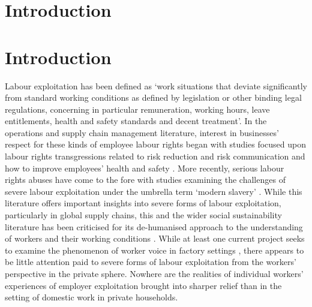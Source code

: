\documentclass[
  12pt,
  letterpaper,
  DIV=11,
  numbers=noendperiod]{scrartcl}
\theoremstyle{plain}
\theoremstyle{definition}
\renewcommand*\contentsname{Table of contents}
\newcommand\contentsname{Table of contents}
\begin{document}
\renewcommand*\contentsname{Table of contents}
{
\hypersetup{linkcolor=}
\setcounter{tocdepth}{3}
\tableofcontents
}

\newpage

\section{Introduction}\label{introduction}

\section{Introduction}\label{introduction}

Labour exploitation has been defined as `work situations that deviate 
significantly from standard working conditions as defined by legislation
or other binding legal regulations, concerning in particular
remuneration, working hours, leave entitlements, health and safety
standards and decent treatment'\autocite[10]{european_union_for_fundamental_rights_severe_2015}. In the operations and supply chain management literature,
interest in businesses' respect for these kinds of employee labour rights began with
studies focused upon labour rights transgressions related to risk
reduction and risk communication and how to improve
employees' health and safety \autocite{chinander_aligning_2001,wolf_operationalizing_2001}. More recently, 
serious labour rights abuses have come to the fore with studies
examining the challenges of severe labour exploitation under the umbrella term `modern slavery' \autocite{gold_modern_2015,new_modern_2015,benstead_horizontal_2018,stevenson_modern_2018}. While this literature
offers important insights into severe forms of labour exploitation, particularly
in global supply chains, this and the wider social sustainability literature has
been criticised for its de-humanised approach to the understanding
of workers and their working conditions \autocite{soundararajan_humanizing_2021}. While at least one current
project seeks to examine the phenomenon of worker voice in factory
settings  \autocite{leverhulme_trust_research_2022}, there appears to be little attention paid to severe forms of labour exploitation from the workers' perspective in the private sphere. Nowhere are the realities of individual workers' experiences of employer exploitation brought into sharper relief than in the setting of domestic
work in private households.
\end{document}
